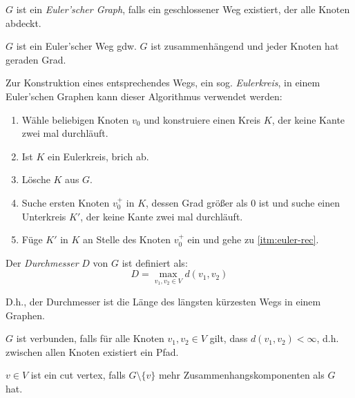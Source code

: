 \begin{definition}
    $ G $ ist ein \textit{Euler'scher Graph}, falls ein geschlossener Weg existiert, der alle Knoten abdeckt.
\end{definition}

\begin{proposition}
    $ G $ ist ein Euler'scher Weg gdw. $ G $ ist zusammenhängend und jeder Knoten hat geraden Grad.
\end{proposition}

\begin{definition}
    Zur Konstruktion eines entsprechendes Wegs, ein sog. \textit{Eulerkreis}, in einem Euler'schen Graphen kann dieser Algorithmus verwendet werden:
    \begin{enumerate}
        \item Wähle beliebigen Knoten $ v_0 $ und konstruiere einen Kreis $ K $, der keine Kante zwei mal durchläuft.
        \item \label{itm:euler-rec}
        Ist $ K $ ein Eulerkreis, brich ab.
        \item Lösche $ K $ aus $ G $.
        \item Suche ersten Knoten $ v_0^+ $ in $ K $, dessen Grad größer als $ 0 $ ist und suche einen Unterkreis $ K' $, der keine Kante zwei mal durchläuft.
        \item Füge $ K' $ in $ K $ an Stelle des Knoten $ v_0^+ $ ein und gehe zu \ref{itm:euler-rec}.
    \end{enumerate}
\end{definition}

\begin{definition}[Durchmesser]
    Der \textit{Durchmesser} $ D $ von $ G $ ist definiert als:
    \begin{equation*}
        D = \max_{v_1, v_2 \in V} d(v_1, v_2)
    \end{equation*}

    D.h., der Durchmesser ist die Länge des längsten kürzesten Wegs in einem Graphen.
\end{definition}

\begin{definition}[Verbundenheit]
    $ G $ ist verbunden, falls für alle Knoten $ v_1, v_2 \in V $ gilt, dass $ d(v_1, v_2) < \infty $, d.h. zwischen allen Knoten existiert ein Pfad.
\end{definition}

\begin{definition}
    $ v \in V $ ist ein cut vertex, falls $ G \setminus \{ v \} $ mehr Zusammenhangskomponenten als $ G $ hat.
\end{definition}

